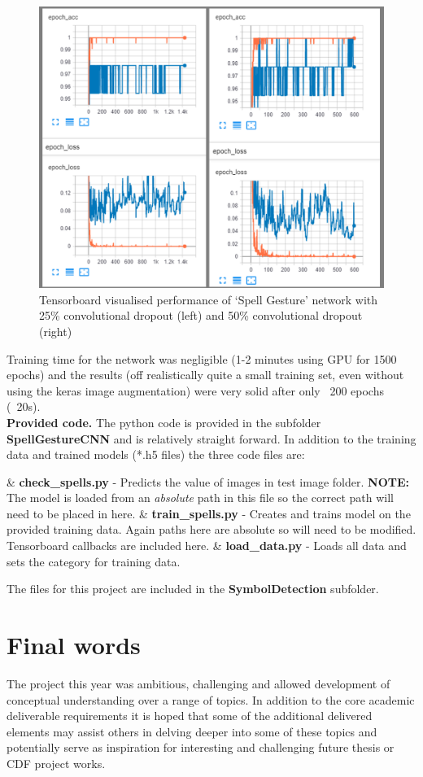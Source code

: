\documentclass{article}
\begin{document}
\begin{figure}[h!]
	\centering
	\includegraphics[width=0.5\linewidth]{symbolPerformance.png}
	\caption{Tensorboard visualised performance of `Spell Gesture' network with 25\% convolutional dropout (left) and 50\% convolutional dropout (right)}
	\label{symbolPerformance}
\end{figure}


Training time for the network was negligible (1-2 minutes using GPU for 1500 epochs) and the results (off realistically quite a small training set, even without using the keras image augmentation) were very solid after only ~200 epochs (~20s).\\ 

\textbf{Provided code.} The python code is provided in the subfolder \textbf{SpellGestureCNN} and is relatively straight forward. In addition to the training data and trained models (*.h5 files) the three code files are:

\begin{easylist}[itemize]
	& \textbf{check\_spells.py} - Predicts the value of images in test image folder. \textbf{NOTE:} The model is loaded from an \textit{absolute} path in this file so the correct path will need to be placed in here.
	& \textbf{train\_spells.py} - Creates and trains model on the provided training data. Again paths here are absolute so will need to be modified. Tensorboard callbacks are included here.
	& \textbf{load\_data.py} - Loads all data and sets the category for training data.\\
\end{easylist}

The files for this project are included in the \textbf{SymbolDetection} subfolder.

\section*{Final words}
The project this year was ambitious, challenging and allowed development of conceptual understanding over a range of topics. In addition to the core academic deliverable requirements it is hoped that some of the additional delivered elements may assist others in delving deeper into some of these topics and potentially serve as inspiration for interesting and challenging future thesis or CDF project works. 
\end{document}
